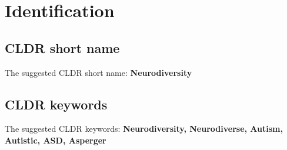 \section{Identification}

\subsection{CLDR short name}
The suggested CLDR short name: \textbf{Neurodiversity}

\subsection{CLDR keywords}
The suggested CLDR keywords: \textbf{Neurodiversity, Neurodiverse, Autism, Autistic, ASD, Asperger}
